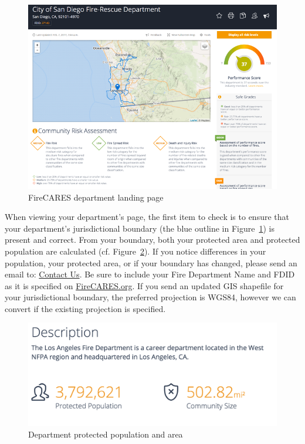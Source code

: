 \documentclass[12pt,oneside]{book}
\begin{document}
\begin{figure}[ht!]
\centering
\includegraphics[width=.9\columnwidth]{Figures/department_page}
\caption{FireCARES department landing page}
\label{fig:department_page}
\end{figure}

When viewing your department's page, the first item to check is to ensure that your department's jurisdictional boundary (the blue outline in Figure~\ref{fig:department_page}) is present and correct.  From your boundary, both your protected area and protected population are calculated (cf. Figure~\ref{fig:description}). If you notice differences in your population, your protected area, or if your boundary has changed, please send an email to: \href{mailto:boundaries@firecares.org}{Contact Us}. Be sure to include your Fire Department Name and FDID as it is specified on \href{https://www.FireCARES.org}{FireCARES.org}. If you send an updated GIS shapefile for your jurisdictional boundary, the preferred projection is WGS84, however we can convert if the existing projection is specified.

\begin{figure}[ht!]
\centering
\includegraphics[width=.9\columnwidth]{Figures/description}
\caption{Department protected population and area}
\label{fig:description}
\end{figure}
\end{document}
